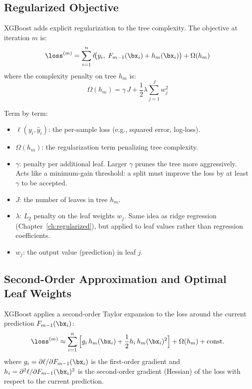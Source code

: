 \subsection{Regularized Objective}

XGBoost adds explicit regularization to the tree complexity.
The objective at iteration $m$ is:
\begin{equation}
\loss^{(m)} = \sum_{i=1}^n \ell\!\big(y_i,\; F_{m-1}(\bx_i) + h_m(\bx_i)\big) + \Omega(h_m)
\label{eq:xgb-objective}
\end{equation}
where the complexity penalty on tree $h_m$ is:
\begin{equation}
\Omega(h_m) = \gamma \, J + \frac{1}{2}\lambda \sum_{j=1}^J w_j^2
\label{eq:xgb-regularization}
\end{equation}

Term by term:
\begin{itemize}[nosep]
  \item $\ell(y_i, \hat{y}_i)$: the per-sample loss (e.g., squared error, log-loss).
  \item $\Omega(h_m)$: the regularization term penalizing tree complexity.
  \item $\gamma$: penalty per additional leaf. Larger $\gamma$ prunes the tree more aggressively. Acts like a minimum-gain threshold: a split must improve the loss by at least $\gamma$ to be accepted.
  \item $J$: the number of leaves in tree $h_m$.
  \item $\lambda$: $L_2$ penalty on the leaf weights $w_j$. Same idea as ridge regression (Chapter~\ref{ch:regularized}), but applied to leaf values rather than regression coefficients.
  \item $w_j$: the output value (prediction) in leaf $j$.
\end{itemize}

\subsection{Second-Order Approximation and Optimal Leaf Weights}

XGBoost applies a second-order Taylor expansion to the loss around the current prediction $F_{m-1}(\bx_i)$:
\begin{equation}
\loss^{(m)} \approx \sum_{i=1}^n \Big[ g_i \, h_m(\bx_i) + \frac{1}{2} h_i \, h_m(\bx_i)^2 \Big] + \Omega(h_m) + \text{const.}
\label{eq:xgb-taylor}
\end{equation}
where $g_i = \partial \ell / \partial F_{m-1}(\bx_i)$ is the first-order gradient and $h_i = \partial^2 \ell / \partial F_{m-1}(\bx_i)^2$ is the second-order gradient (Hessian) of the loss with respect to the current prediction.

